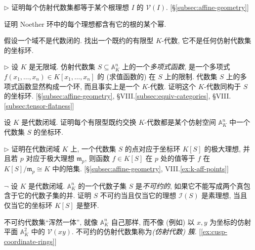 \begin{prob}\label{ex:alg-set-radical-ideal}
$\triangleright$ 证明每个仿射代数集都等于某个根理想 $I$ 的 $\mathcal{V}(I)$. [§\ref{subsec:affine-geometry}]
\end{prob}

\begin{prob}\label{ex:noetherian-power-radical}
证明 Noether 环中的每个理想都含有它的根的某个幂.
\end{prob}

\begin{prob}\label{ex:reduced-not-coordinate}
假设一个域不是代数闭的. 找出一个既约的有限型 $K$-代数, 它不是任何仿射代数集的坐标环.
\end{prob}

\begin{prob}\label{ex:polynomial-functions}
$\triangleright$ 设 $K$ 是无限域. 仿射代数集 $S\subseteq\mathbb{A}_K^n$ 上的一个\emph{多项式函数}, 是一个多项式 $f(x_1,\ldots ,x_n)\in K[x_1,\ldots ,x_n]$ 的 (求值函数的) 在 $S$ 上的限制. 代数集 $S$ 上的多项式函数显然构成一个环, 而且事实上是一个 $K$-代数. 证明这个 $K$-代数同构于 $S$ 的坐标环. [§\ref{subsec:affine-geometry}, §VIII.\ref{subsec:equiv-categories}, §VIII.\ref{subsec:tensor-flatness}]
\end{prob}

\begin{prob}\label{ex:reduced-fg-is-coordinate}
设 $K$ 是代数闭域. 证明每个有限型既约交换 $K$-代数都是某个仿射空间 $\mathbb{A}_K^n$ 中一个代数集 $S$ 的坐标环.
\end{prob}

\begin{prob}\label{ex:points-maximal-ideals}
$\triangleright$ 证明在代数闭域 $K$ 上, 一个代数集 $S$ 的点对应于坐标环 $K[S]$ 的极大理想, 并且若 $p$ 对应于极大理想 $\mathfrak{m}_p$, 则函数 $f\in K[S]$ 在 $p$ 处的值等于 $f$ 在 $K[S]/\mathfrak{m}_p\cong K$ 中的陪集. [§\ref{subsec:affine-geometry}, VIII.\ref{ex:k-aff-points}]
\end{prob}

\begin{prob}\label{ex:irreducible-prime}
$\neg$ 设 $K$ 是代数闭域. $\mathbb{A}_K^n$ 的一个代数子集 $S$ 是\emph{不可约的}, 如果它不能写成两个真包含于它的代数子集的并. 证明 $S$ 不可约当且仅当它的理想 $\mathcal{I}(S)$ 是素理想, 当且仅当它的坐标环 $K[S]$ 是整环.

不可约代数集``浑然一体'', 就像 $\mathbb{A}_K^n$ 自己那样, 而不像 (例如) 以 $x,y$ 为坐标的仿射平面 $\mathbb{A}_K^2$ 中的 $\mathcal{V}(xy)$. 不可约的仿射代数集称为\emph{(仿射代数) 簇}. [\ref{ex:cusp-coordinate-rings}]
\end{prob}

